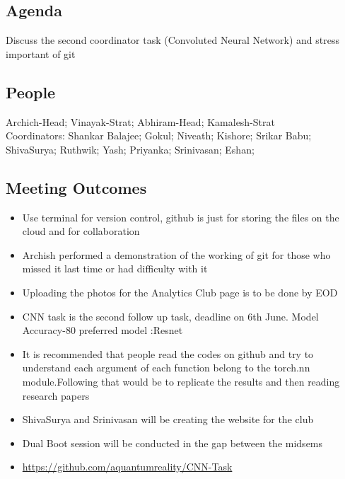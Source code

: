 \documentclass[11pt]{scrartcl}
\begin{document}
\subsection{Agenda}
Discuss the second coordinator task (Convoluted Neural Network) and stress important of git
\subsection{People}
Archich-Head;
Vinayak-Strat;
Abhiram-Head;
Kamalesh-Strat\\
Coordinators:
Shankar Balajee;
Gokul;
Niveath;
Kishore;
Srikar Babu;
ShivaSurya;
Ruthwik;
Yash;
Priyanka;
Srinivasan;
Eshan;
\subsection{Meeting Outcomes}
\begin{itemize}
    \item Use terminal for version control, github is just for storing the files on the cloud and for collaboration
    \item Archish performed a demonstration of the working of git for those who missed it last time or had difficulty with it
    \item Uploading the photos for the Analytics Club page is to be done by EOD
    \item CNN task is the second follow up task, deadline on 6th June. Model Accuracy-80 %
    preferred model :Resnet
    \item It is recommended that people read the codes on github and try to understand each argument of each function belong to the torch.nn module.Following that would be to replicate the results and then reading research papers
    \item ShivaSurya and Srinivasan will be creating the website for the club 
    \item Dual Boot session will be conducted in the gap between the midsems
    \item \url{https://github.com/aquantumreality/CNN-Task}
\end{itemize}
\end{document}
